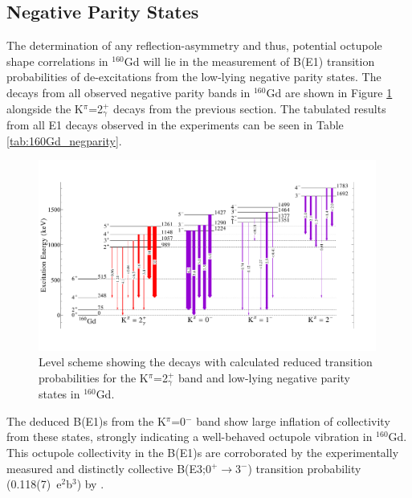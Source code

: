 \subsection{Negative Parity States}\label{sec:160Gd_negparity}
The determination of any reflection-asymmetry and thus, potential octupole shape correlations in $^{160}$Gd will lie in the measurement of B(E1) transition probabilities of de-excitations from the low-lying negative parity states. The decays from all observed negative parity bands in $^{160}$Gd are shown in Figure \ref{fig:160Gd_Octupole} alongside the K$^\pi$=2$^+_\gamma$ decays from the previous section. The tabulated results from all E1 decays observed in the experiments can be seen in Table \ref{tab:160Gd_negparity}.

\begin{center}
\begin{figure}[h!]
\includegraphics[width=0.99\textwidth]{160Gd_OctupoleRevised.pdf}
\caption{Level scheme showing the decays with calculated reduced transition probabilities for the K$^\pi$=2$^+_\gamma$ band and low-lying negative parity states in $^{160}$Gd. \label{fig:160Gd_Octupole}}
\end{figure}
\end{center}                                    
                                                

 The deduced B(E1)s from the K$^\pi$=0$^-$ band show large inflation of collectivity from these states, strongly indicating a well-behaved octupole vibration in $^{160}$Gd. This octupole collectivity in the B(E1)s are corroborated by the experimentally measured and distinctly collective B(E3;0$^+\rightarrow$3$^-$) transition probability (0.118(7)~e$^2$b$^3$) by \cite{McGowan_BE2_1981}.

